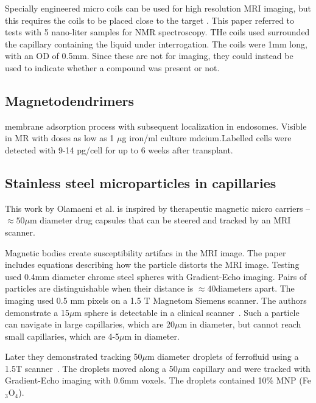 \documentclass[letterpaper, 10 pt, conference]{ieeeconf}
\begin{document}
 
 Specially engineered micro coils can be used for high resolution MRI imaging, but this requires the coils to be placed close to the target \cite{olson1995high}.  This paper referred to tests with 5 nano-liter samples for NMR spectroscopy.  THe coils used surrounded the capillary containing the liquid under interrogation. The coils were 1mm long, with an OD of 0.5mm. Since these are not for imaging, they could instead be used to indicate whether a compound was present or not.
 
 \subsection{Magnetodendrimers}
 \cite{bulte2001magnetodendrimers}
 
 membrane adsorption process with subsequent localization in endosomes. Visible in MR with doses as low as 1 $\mu$g iron/ml culture mdeium.Labelled cells were detected with 9-14 pg/cell for up to 6 weeks after transplant. 
 

 
 
\subsection{Stainless steel microparticles in capillaries}
This work by Olamaeni et al. \cite{olamaei2011accurate} is inspired by therapeutic magnetic micro carriers -- $\approx 50\mu$m diameter drug capsules that can be steered and tracked by an MRI scanner. 

Magnetic bodies create susceptibility artifacs in the MRI image. The paper\cite{olamaei2011accurate}  includes equations describing how the particle distorts the MRI image.  Testing used 0.4mm diameter chrome steel spheres with Gradient-Echo imaging. Pairs of particles are distinguishable when their distance is $\approx40$diameters apart. The imaging used 0.5 mm pixels on a 1.5 T Magnetom Siemens scanner.  The authors demonstrate a 15$\mu$m sphere is detectable in a clinical scanner~\cite{olamaei2010mri}. Such a particle can navigate in large capillaries, which are 20$\mu$m in diameter, but cannot reach small capillaries, which are 4-5$\mu$m in diameter.
 
 Later they demonstrated tracking 50$\mu$m diameter droplets of ferrofluid using a 1.5T scanner~\cite{olamaei2013magnetic}.  The droplets moved along a 50$\mu$m capillary and were tracked with Gradient-Echo imaging with 0.6mm voxels.  The droplets contained 10\% MNP (Fe$_\textrm{3}$O$_{\textrm{4}}$).
 
\end{document}
